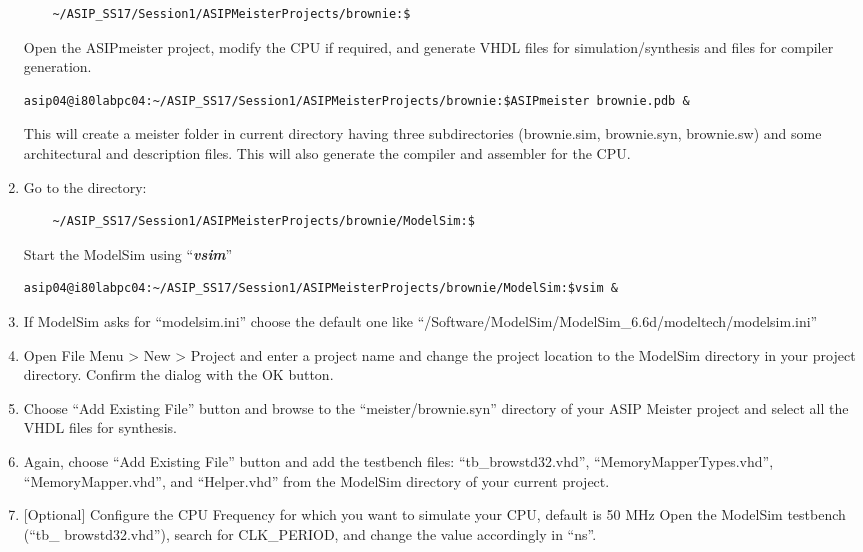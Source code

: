 \begin{enumerate}
\begin{lstlisting}
	~/ASIP_SS17/Session1/ASIPMeisterProjects/brownie:$ 
\end{lstlisting}
Open the ASIPmeister project, modify the CPU if required, and generate VHDL files for simulation/synthesis and files for compiler generation.
\begin{lstlisting}
asip04@i80labpc04:~/ASIP_SS17/Session1/ASIPMeisterProjects/brownie:$ASIPmeister brownie.pdb &
\end{lstlisting}
This will create a meister folder in current directory having three subdirectories (brownie.sim, brownie.syn, brownie.sw) and some architectural and description files. This will also generate the compiler and assembler for the CPU.
\item Go to the directory:
\begin{lstlisting} 
	~/ASIP_SS17/Session1/ASIPMeisterProjects/brownie/ModelSim:$ 
\end{lstlisting}
Start the ModelSim using ``\emph{\textbf{vsim}}''
\begin{lstlisting}
asip04@i80labpc04:~/ASIP_SS17/Session1/ASIPMeisterProjects/brownie/ModelSim:$vsim &
\end{lstlisting}
\item If ModelSim asks for ``modelsim.ini'' choose the default one like ``/Software/ModelSim/ModelSim\_6.6d/modeltech/modelsim.ini'' 
\item Open File Menu \textgreater{} New \textgreater{} Project and enter a project name and change the project location to the ModelSim directory in your project directory. Confirm the dialog with the OK button.
\item Choose ``Add Existing File'' button and browse to the ``meister/brownie.syn'' directory of your ASIP Meister project and select all the VHDL files for synthesis.
\item Again, choose ``Add Existing File'' button and add the testbench  files: ``tb\_browstd32.vhd'', ``MemoryMapperTypes.vhd'', ``MemoryMapper.vhd'', and ``Helper.vhd'' from the ModelSim directory of your current project.
\item {[}Optional{]} Configure the CPU Frequency for which you want to simulate your CPU, default is 50 MHz Open the ModelSim testbench (``tb\_ browstd32.vhd''), search for CLK\_PERIOD, and change the value accordingly in ``ns''.
\end{enumerate}
